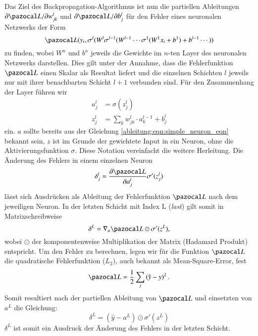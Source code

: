 Das Ziel des Backpropagation-Algorithmus ist nun die partiellen Ableitungen $\partial \Lb / \partial w^l_{jk}$ und $\partial \Lb / \partial b^l_j$ für den Fehler eines neuronalen Netzwerks der Form
\begin{equation}
\Lb(y_{i}, \sigma^{l}(W^{l}\sigma^{l-1}(W^{l-1}\cdots \sigma^{1}(W^{1}x_i+b^{1}) + b^{l-1} \cdots ) )
\end{equation}
zu finden, wobei $W^{n}$ und $b^{n}$ jeweils die Gewichte im $n$-ten Layer des neuronalen Netzwerks darstellen. Dies gilt unter der Annahme, dass die Fehlerfunktion $\Lb$ einen Skalar als Resultat liefert und die einzelnen Schichten $l$ jeweils nur mit ihrer benachbarten Schicht $l+1$ verbunden sind.
Für den Zusammenhang der Layer führen wir
\begin{equation}
	\begin{split}
		a^l_j &= \sigma(z^l_j) \\
		z^l_j &= \sum\limits_{k}w^{l}_{jk} \cdot a^{l-1}_{k}+b^{l}_{j}
	\end{split}
\end{equation}
ein. $a$ sollte bereits aus der Gleichung \ref{ableitung:eqn:simple_neuron_eqn} bekannt sein, $z$ ist im Grunde der gewichtete Input in ein Neuron, ohne die Aktivierungsfunktion $\sigma$. Diese Notation vereinfacht die weitere Herleitung. Die Änderung des Fehlers in einem einzelnen Neuron
\begin{equation}
	\delta^{l}_{j} = \frac{\partial \Lb}{\partial a^{l}_{j}} \sigma'(z^l_j)
\end{equation}
lässt sich Ausdrücken als Ableitung der Fehlerfunktion $\Lb$ nach dem jeweiligen Neuron. In der letzten Schicht mit Index L (\textit{last}) gilt somit in Matrixschreibweise
\begin{equation}
	\delta^{L} = \nabla_a \Lb \odot \sigma'(z^L) \text{,}
\end{equation}
wobei $\odot$ der komponentenweise Multiplikation der Matrix (Hadamard Produkt) entspricht. 
Um den Fehler zu berechnen, legen wir für die Funktion $\Lb$ die quadratische Fehlerfunktion ($L_2$), auch bekannt als Mean-Square-Error, fest
\begin{equation}
	\Lb = \frac{1}{2} \sum_j \left( \hat{y} - y \right)^2 \text{.}
\end{equation}
Somit resultiert nach der partiellen Ableitung von $\Lb$ und einsetzten von $a^L$ die Gleichung:
\begin{equation}
	\delta^{L} = (\hat{y} - a^L) \odot \sigma'(z^L)
\end{equation}
$\delta^L$ ist somit ein Ausdruck der Änderung des Fehlers in der letzten Schicht.

